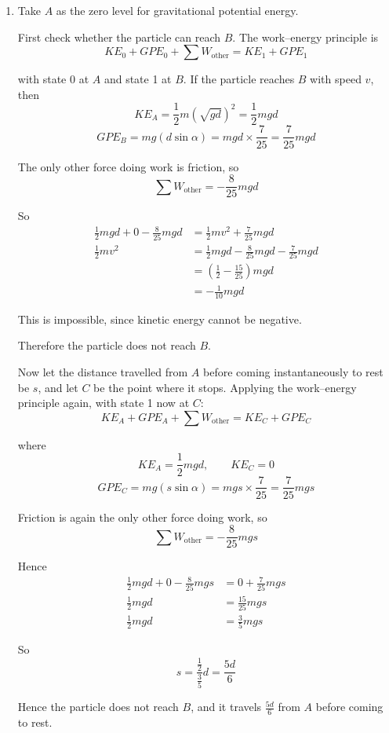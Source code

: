 \documentclass[leqno]{article}
\begin{document}
\begin{enumerate}[
  label=\textbf{\arabic*.},
  leftmargin=*,
  topsep=0pt,
  partopsep=0pt,
  parsep=0pt
]
\begin{djsSolution}
\begin{enumerate}[label=\textbf{(\alph*)}]
  \item Take \(A\) as the zero level for gravitational potential energy.

First check whether the particle can reach \(B\). The work--energy principle is
\[
KE_0+GPE_0+\sum W_{\text{other}}=KE_1+GPE_1
\]

with state 0 at \(A\) and state 1 at \(B\). If the particle reaches \(B\) with speed \(v\), then
\[
KE_A=\frac12 m(\sqrt{gd})^2=\frac12 mgd
\]
\[
GPE_B=mg(d\sin\alpha)=mgd\times \frac{7}{25}=\frac{7}{25}mgd
\]

The only other force doing work is friction, so
\[
\sum W_{\text{other}}=-\frac{8}{25}mgd
\]

So
\begin{align*}
\frac12 mgd+0-\frac{8}{25}mgd&=\frac12 mv^2+\frac{7}{25}mgd \\
\frac12 mv^2&=\frac12 mgd-\frac{8}{25}mgd-\frac{7}{25}mgd \\
&=\left(\frac12-\frac{15}{25}\right)mgd \\
&=-\frac{1}{10}mgd
\end{align*}

This is impossible, since kinetic energy cannot be negative.

Therefore the particle does not reach \(B\).

Now let the distance travelled from \(A\) before coming instantaneously to rest be \(s\), and let \(C\) be the point where it stops. Applying the work--energy principle again, with state 1 now at \(C\):
\[
KE_A+GPE_A+\sum W_{\text{other}}=KE_C+GPE_C
\]

where
\[
KE_A=\frac12 mgd,\qquad KE_C=0
\]
\[
GPE_C=mg(s\sin\alpha)=mg s\times \frac{7}{25}=\frac{7}{25}mgs
\]

Friction is again the only other force doing work, so
\[
\sum W_{\text{other}}=-\frac{8}{25}mgs
\]

Hence
\begin{align*}
\frac12 mgd+0-\frac{8}{25}mgs&=0+\frac{7}{25}mgs \\
\frac12 mgd&=\frac{15}{25}mgs \\
\frac12 mgd&=\frac35 mgs
\end{align*}

So
\[
s=\frac{\frac12}{\frac35}d=\frac{5d}{6}
\]

Hence the particle does not reach \(B\), and it travels \(\frac{5d}{6}\) from \(A\) before coming to rest.
\end{enumerate}
\end{djsSolution}



\end{enumerate}
\end{document}

